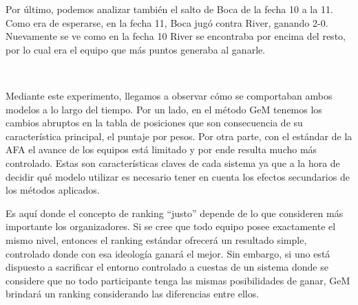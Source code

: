 Por último, podemos analizar también el salto de Boca de la fecha 10 a la 11.
Como era de esperarse, en la fecha 11, Boca jugó contra River, ganando 2-0.
Nuevamente se ve como en la fecha 10 River se encontraba por encima del resto,
por lo cual era el equipo que más puntos generaba al ganarle.

~

Mediante este experimento, llegamos a observar cómo se comportaban ambos modelos
a lo largo del tiempo. Por un lado, en el método GeM tenemos los cambios
abruptos en la tabla de posiciones que son consecuencia de su característica
principal, el puntaje por pesos. Por otra parte, con el estándar de la AFA el
avance de los equipos está limitado y por ende resulta mucho más controlado.
Estas son características claves de cada sistema ya que a la hora de decidir qué
modelo utilizar es necesario tener en cuenta los efectos secundarios de los
métodos aplicados.

Es aquí donde el concepto de ranking ``justo'' depende de lo que consideren más
importante los organizadores. Si se cree que todo equipo posee exactamente el
mismo nivel, entonces el ranking estándar ofrecerá un resultado simple,
controlado donde con esa ideología ganará el mejor. Sin embargo, si uno está
dispuesto a sacrificar el entorno controlado a cuestas de un sistema donde se
considere que no todo participante tenga las mismas posibilidades de ganar, GeM brindará un
ranking considerando las diferencias entre ellos.
